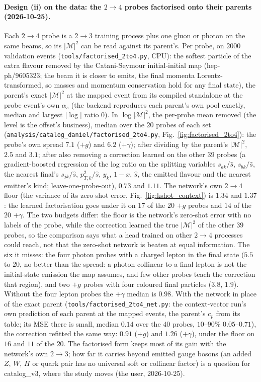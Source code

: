 \documentclass[11pt]{article}
\newcommand{\code}[1]{\texttt{#1}}
\begin{document}
\paragraph{Design (ii) on the data: the $2\to4$ probes factorised onto their parents (2026-10-25).} Each $2\to4$
probe is a $2\to3$ training process plus one gluon or photon on the same beams, so its $|\mathcal M|^2$ can be read
against its parent's. Per probe, on $2000$ validation events (\code{tools/factorised\_2to4.py},
CPU): the softest particle of the extra flavour removed by the Catani-Seymour initial-initial map (hep-ph/9605323; the
beam it is closer to emits, the final momenta Lorentz-transformed, so masses and momentum conservation hold for any final
state), the parent's exact $|\mathcal M|^2$ at the mapped event from its compiled standalone at the probe event's own
$\alpha_s$ (the backend reproduces each parent's own pool exactly, median and largest $|\log|$ ratio $0$). In
$\log|\mathcal M|^2$, the per-probe mean removed (the level is the offset's business), median over the $20$ probes of each
set (\code{analysis/catalog\_daniel/factorised\_2to4.py}, Fig.~\ref{fig:factorised_2to4}): the probe's own spread $7.1$
($+g$) and $6.2$ ($+\gamma$); after dividing by the parent's $|\mathcal M|^2$, $2.5$ and $3.1$; after also removing a
correction learned on the other $39$ probes (a gradient-boosted regression of the log ratio on the splitting variables
$s_{ak}/\hat s$, $s_{bk}/\hat s$, the nearest final's $s_{jk}/\hat s$, $p_{T,k}^2/\hat s$, $y_k$, $1-x$, $\hat s$, the
emitted flavour and the nearest emitter's kind; leave-one-probe-out), $0.73$ and $1.11$. The network's own $2\to4$ floor
(the variance of its zero-shot error, Fig.~\ref{fig:kshot_context}) is $1.34$ and $1.37$: the learned factorisation goes
under it on $17$ of the $20$ $+g$ probes and $14$ of the $20$ $+\gamma$. The two budgets differ: the floor is
the network's zero-shot error with no labels of the probe, while the correction learned the true $|\mathcal M|^2$ of
the other $39$ probes, so the comparison says what a head trained on other $2\to4$ processes could reach, not that the
zero-shot network is beaten at equal information. The six it misses: the four photon probes with
a charged lepton in the final state ($5.5$ to $20$, no better than the spread: a photon collinear to a final lepton is
not the initial-state emission the map assumes, and few other probes teach the correction that region), and two $+g$
probes with four coloured final particles ($3.8$, $1.9$). Without the four lepton probes the $+\gamma$ median is $0.98$.
With the network in place of the exact parent (\code{tools/factorised\_2to4\_net.py}: the context-vector run's own
prediction of each parent at the mapped events, the parent's $c_p$ from its table; its MSE there is small, median $0.14$
over the $40$ probes, $10$--$90\%$ $0.05$--$0.71$), the correction refitted the same way: $0.91$ ($+g$) and $1.26$
($+\gamma$), under the floor on $16$ and $11$ of the $20$. The factorised form keeps most of its gain with the network's
own $2\to3$; how far it carries beyond emitted gauge bosons (an added $Z$, $W$, $H$ or quark pair has no universal soft
or collinear factor) is a question for catalog\_v3, where the study moves (the user, 2026-10-25).
\end{document}
